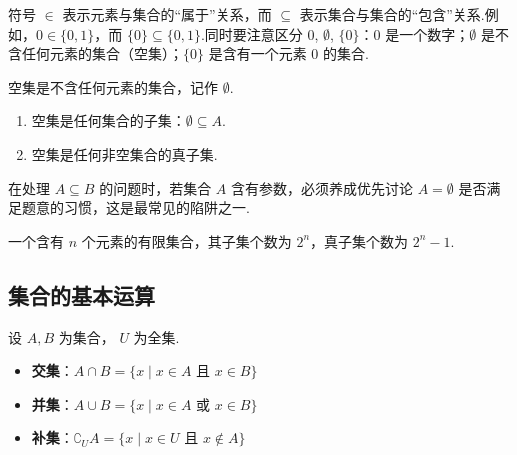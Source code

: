 	\begin{note}[易错点辨析]
		符号 $\in$ 表示元素与集合的“属于”关系，而 $\subseteq$ 表示集合与集合的“包含”关系.例如，$0 \in \{0,1\}$，而 $\{0\} \subseteq \{0,1\}$.同时要注意区分 $0$, $\emptyset$, $\{0\}$：$0$ 是一个数字；$\emptyset$ 是不含任何元素的集合（空集）；$\{0\}$ 是含有一个元素 $0$ 的集合.
	\end{note}
	
	\begin{property}[空集] \label{property:empty_set}
		空集是不含任何元素的集合，记作 $\emptyset$.
		\begin{enumerate}
			\item 空集是任何集合的子集：$\emptyset \subseteq A$.
			\item 空集是任何非空集合的真子集.
		\end{enumerate}
	\end{property}
	
	\begin{note}[解题要点]
		在处理 $A \subseteq B$ 的问题时，若集合 $A$ 含有参数，必须养成优先讨论 $A = \emptyset$ 是否满足题意的习惯，这是最常见的陷阱之一.
	\end{note}
	
	一个含有 $n$ 个元素的有限集合，其子集个数为 $2^n$，真子集个数为 $2^n - 1$.
	
	\subsection{集合的基本运算}
	
	\begin{definition}[并集、交集、补集] \label{def:set_operations}
		设 $A, B$ 为集合， $U$ 为全集.
		\begin{itemize}
			\item \textbf{交集}：$A \cap B = \{x \mid x \in A \text{ 且 } x \in B\}$
			\item \textbf{并集}：$A \cup B = \{x \mid x \in A \text{ 或 } x \in B\}$
			\item \textbf{补集}：$\complement_U A = \{x \mid x \in U \text{ 且 } x \notin A\}$
		\end{itemize}
	\end{definition}
	
